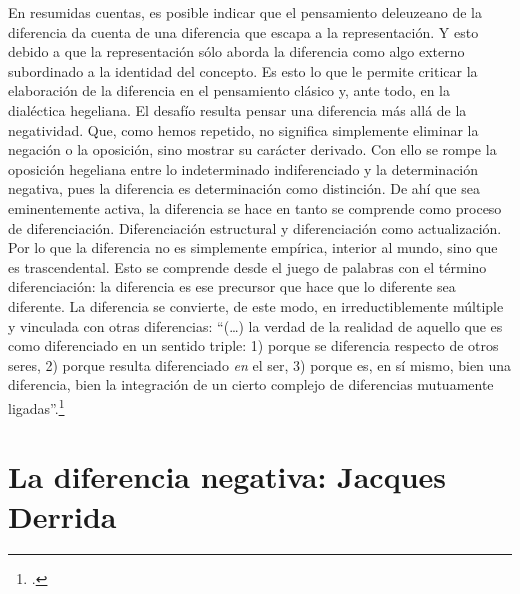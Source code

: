 En resumidas cuentas, es posible indicar que el pensamiento deleuzeano de la diferencia da cuenta de una diferencia que escapa a la representación. Y esto debido a que la representación sólo aborda la diferencia como algo externo subordinado a la identidad del concepto. Es esto lo que le permite criticar la elaboración de la diferencia en el pensamiento clásico y, ante todo, en la dialéctica hegeliana. El desafío resulta pensar una diferencia más allá de la negatividad. Que, como hemos repetido, no significa simplemente eliminar la negación o la oposición, sino mostrar su carácter derivado. Con ello se rompe la oposición hegeliana entre lo indeterminado indiferenciado y la determinación negativa, pues la diferencia es determinación como distinción. De ahí que sea eminentemente activa, la diferencia se hace en tanto se comprende como proceso de diferenciación. Diferenciación estructural y diferenciación como actualización. Por lo que la diferencia no es simplemente empírica, interior al mundo, sino que es trascendental. Esto se comprende desde el juego de palabras con el término diferenciación: la diferencia es ese precursor que hace que lo diferente sea diferente. La diferencia se convierte, de este modo, en irreductiblemente múltiple y vinculada con otras diferencias: \enquote{(\dots) la verdad de la realidad de aquello que es como diferenciado en un sentido triple: 1) porque se diferencia respecto de otros seres, 2) porque resulta diferenciado \emph{en} el ser, 3) porque es, en sí mismo, bien una diferencia, bien la integración de un cierto complejo de diferencias mutuamente ligadas}.\footcite[17]{@6977-GALLEGO2008}

\section{La diferencia negativa: Jacques Derrida}

